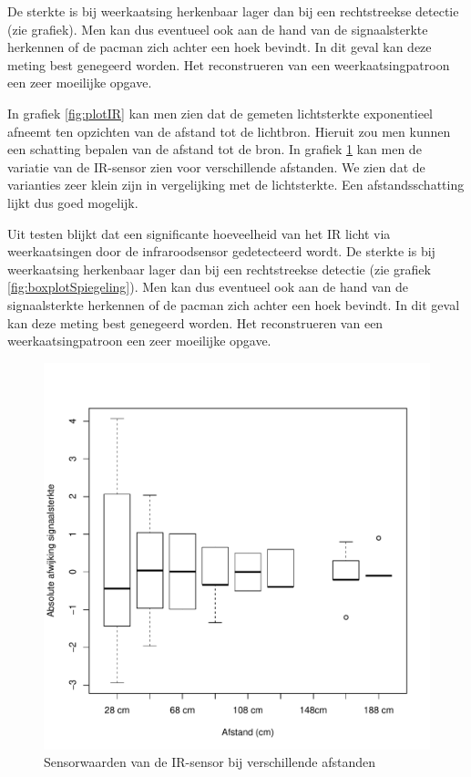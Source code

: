\documentclass[12pt,a4paper]{report}
\begin{document}
 De sterkte is bij weerkaatsing herkenbaar lager dan bij een rechtstreekse detectie (zie grafiek). Men kan dus eventueel ook aan de hand van de signaalsterkte herkennen of de pacman zich achter een hoek bevindt. In dit geval kan deze meting best genegeerd worden. Het reconstrueren van een weerkaatsingpatroon een zeer moeilijke opgave.

In grafiek \ref{fig:plotIR} kan men zien dat de gemeten lichtsterkte exponentieel afneemt ten opzichten van de afstand tot de lichtbron.
Hieruit zou men kunnen een schatting bepalen van de afstand tot de bron. In grafiek \ref{fig:boxplotIR} kan men de variatie van de IR-sensor zien voor verschillende afstanden. We zien dat de varianties zeer klein zijn in vergelijking met de lichtsterkte. Een afstandsschatting lijkt dus goed mogelijk.

Uit testen blijkt dat een significante hoeveelheid van het IR licht via weerkaatsingen door de infraroodsensor gedetecteerd wordt.
De sterkte is bij weerkaatsing herkenbaar lager dan bij een rechtstreekse detectie (zie grafiek \ref{fig:boxplotSpiegeling}).  Men kan dus eventueel ook aan de hand van de signaalsterkte herkennen of de pacman zich achter een hoek bevindt. In dit geval kan deze meting best genegeerd worden. Het reconstrueren van een weerkaatsingpatroon een zeer moeilijke opgave.

\begin{figure}
\begin{center}
 \includegraphics{./resources/bloxplotIR.pdf}
 \caption{Sensorwaarden van de IR-sensor bij verschillende afstanden \label{fig:boxplotIR}}
\end{center}
\end{figure}
\end{document}
